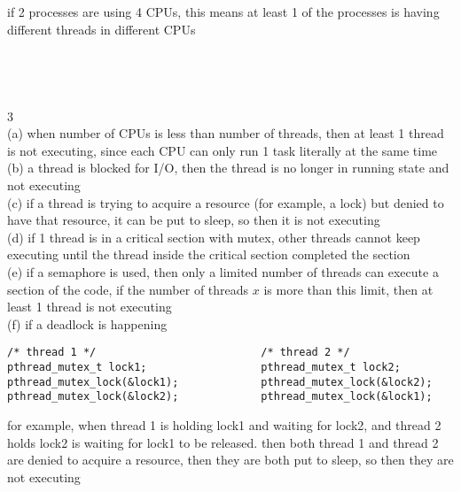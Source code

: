 \documentclass[12pt, border = 4pt, multi]{article} %
\begin{document}
if 2 processes are using 4 CPUs, this means at least 1 of the processes is having different threads in different CPUs\\
\\
\\
\\
\\
3\\
(a) when number of CPUs is less than number of threads, then at least 1 thread is not executing, since each CPU can only run 1 task literally at the same time\\
(b) a thread is blocked for I/O, then the thread is no longer in running state and not executing\\
(c) if a thread is trying to acquire a resource (for example, a lock) but denied to have that resource, it can be put to sleep, so then it is not executing\\
(d) if 1 thread is in a critical section with mutex, other threads cannot keep executing until the thread inside the critical section completed the section\\
(e) if a semaphore is used, then only a limited number of threads can execute a section of the code, if the number of threads $x$ is more than this limit, then at least 1 thread is not executing\\
(f) if a deadlock is happening
\begin{lstlisting}
/* thread 1 */                          /* thread 2 */
pthread_mutex_t lock1;                  pthread_mutex_t lock2;
pthread_mutex_lock(&lock1);             pthread_mutex_lock(&lock2);
pthread_mutex_lock(&lock2);             pthread_mutex_lock(&lock1);
\end{lstlisting}
for example, when thread 1 is holding lock1 and waiting for lock2, and thread 2 holds lock2 is waiting for lock1 to be released. then both thread 1 and thread 2 are denied to acquire a resource, then they are both put to sleep, so then they are not executing
\end{document}
